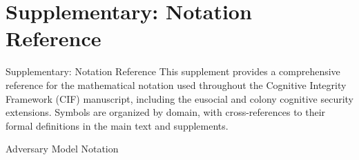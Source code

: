 \documentclass[
  ignorenonframetext,
]{beamer}
\author{\texorpdfstring{}{}}
\date{}
\begin{document}
\begin{frame}
\newpage
\end{frame}

\section{Supplementary: Notation
Reference}\label{sec:notation-reference}

\begin{frame}[allowframebreaks]{Supplementary: Notation Reference}
This supplement provides a comprehensive reference for the mathematical
notation used throughout the Cognitive Integrity Framework (CIF)
manuscript, including the eusocial and colony cognitive security
extensions. Symbols are organized by domain, with cross-references to
their formal definitions in the main text and supplements.
\end{frame}

\begin{frame}[allowframebreaks]{Adversary Model Notation}
\protect{}\label{adversary-model-notation}
\end{frame}
\end{document}
